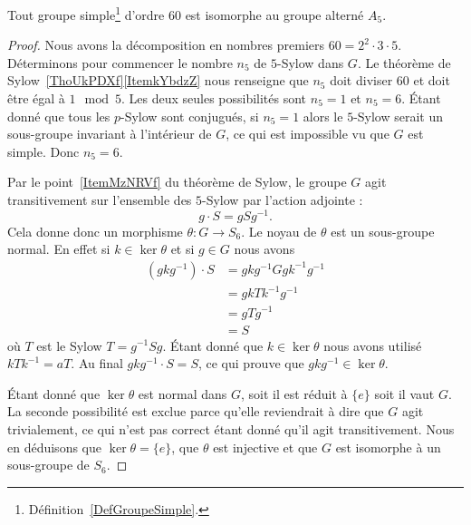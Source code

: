 \begin{proposition}        \label{PROPooUBIWooTrfCat}
	Tout groupe simple\footnote{Définition~\ref{DefGroupeSimple}.} d'ordre \( 60\) est isomorphe au groupe alterné \( A_5\).
\end{proposition}

\begin{proof}
	Nous avons la décomposition en nombres premiers \( 60=2^2\cdot 3\cdot 5\). Déterminons pour commencer le nombre \( n_5\) de \( 5\)-Sylow dans \( G\). Le théorème de Sylow~\ref{ThoUkPDXf}\ref{ItemkYbdzZ} nous renseigne que \( n_5\) doit diviser \( 60\) et doit être égal à \( 1\mod 5\). Les deux seules possibilités sont \( n_5=1\) et \( n_5=6\). Étant donné que tous les \( p\)-Sylow sont conjugués, si \( n_5=1\) alors le \( 5\)-Sylow serait un sous-groupe invariant à l'intérieur de \( G\), ce qui est impossible vu que \( G\) est simple. Donc \( n_5=6\).

	Par le point~\ref{ItemMzNRVf} du théorème de Sylow, le groupe \( G\) agit transitivement sur l'ensemble des \( 5\)-Sylow par l'action adjointe :
	\begin{equation}
		g\cdot S=gSg^{-1}.
	\end{equation}
	Cela donne donc un morphisme \( \theta\colon G\to S_6\). Le noyau de \( \theta\) est un sous-groupe normal. En effet si \( k\in \ker\theta\) et si \( g\in G\) nous avons
	\begin{subequations}
		\begin{align}
			(gkg^{-1})\cdot S & =gkg^{-1} Ggk^{-1}g^{-1} \\
			                  & =gkTk^{-1}g^{-1}         \\
			                  & =gTg^{-1}                \\
			                  & =S
		\end{align}
	\end{subequations}
	où \( T\) est le Sylow \( T=g^{-1}Sg\). Étant donné que \( k\in \ker\theta\) nous avons utilisé \( kTk^{-1}=aT\). Au final \( gkg^{-1}\cdot S=S\), ce qui prouve que \( gkg^{-1} \in\ker\theta\).

	Étant donné que \( \ker\theta\) est normal dans \( G\), soit il est réduit à \( \{ e \}\) soit il vaut \( G\). La seconde possibilité est exclue parce qu'elle reviendrait à dire que \( G\) agit trivialement, ce qui n'est pas correct étant donné qu'il agit transitivement. Nous en déduisons que \( \ker\theta=\{ e \}\), que \( \theta\) est injective et que \( G\) est isomorphe à un sous-groupe de \( S_6\).


\end{proof}
